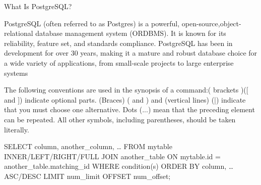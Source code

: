 What Is PostgreSQL? 

PostgreSQL (often referred to as Postgres) is a powerful, open-source,object-relational database management system (ORDBMS). 
It is known for its reliability, feature set, and standards compliance. 
PostgreSQL has been in development for over 30 years, making it a mature and robust database choice for a wide variety of applications,
from small-scale projects to large enterprise systems


The following conventions are used in the synopsis of a command:( brackets )([ and ]) indicate optional parts.
(Braces) ({ and }) and (vertical lines) (|) indicate that you must choose one alternative. 
Dots (...) mean that the preceding element can be repeated. All other symbols, including parentheses, should be taken literally.




SELECT column, another_column, …
FROM mytable
INNER/LEFT/RIGHT/FULL JOIN another_table 
    ON mytable.id = another_table.matching_id
WHERE condition(s)
ORDER BY column, … ASC/DESC
LIMIT num_limit OFFSET num_offset;